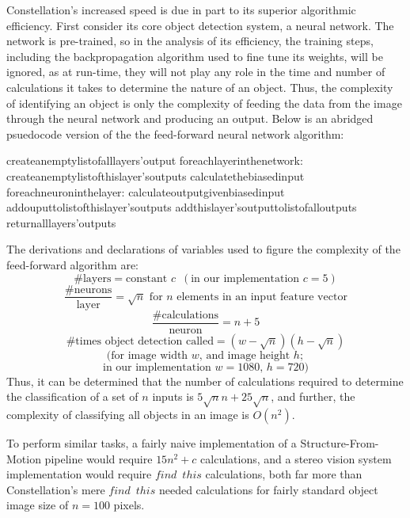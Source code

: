 Constellation's increased speed is due in part to its superior algorithmic efficiency. First consider its core object detection system, a neural network. The network is pre-trained, so in the analysis of its efficiency, the training steps, including the backpropagation algorithm used to fine tune its weights, will be ignored, as at run-time, they will not play any role in the time and number of calculations it takes to determine the nature of an object. Thus, the complexity of identifying an object is only the complexity of feeding the data from the image through the neural network and producing an output. Below is an abridged psuedocode version of the the feed-forward neural network algorithm:
\begin{program}
create\enspace an\enspace empty\enspace list\enspace of\enspace all\enspace layers'\enspace output
for\enspace each\enspace layer\enspace in\enspace the\enspace network:
\enspace\enspace	create\enspace an\enspace empty\enspace list\enspace of\enspace this\enspace layer's\enspace outputs
\enspace\enspace	calculate\enspace the\enspace biased\enspace input
\enspace\enspace	for\enspace each\enspace neuron\enspace in\enspace the\enspace layer:
\enspace\enspace\enspace\enspace		calculate\enspace output\enspace given\enspace biased\enspace input
\enspace\enspace\enspace\enspace		add\enspace ouput\enspace to\enspace list\enspace of\enspace this\enspace layer's\enspace outputs
\enspace\enspace	add\enspace this\enspace layer's\enspace output\enspace to\enspace list\enspace of\enspace all\enspace outputs
return\enspace all\enspace layers'\enspace outputs
\end{program}
The derivations and declarations of variables used to figure the complexity of the feed-forward algorithm are:
$$\text{\# layers}=\text{constant }c \enspace (\text{in our implementation }c=5)$$
$$\frac{\text{\# neurons}}{\text{layer}}=\sqrt{n}\text{ for $n$ elements in an input feature vector}$$
$$\frac{\text{\# calculations}}{\text{neuron}}=n+5$$
$$\text{\# times object detection called}=(w-\sqrt{n})(h-\sqrt{n})$$
$$\text{(for image width }w\text{, and image height }h;$$
$$\text{in our implementation }w=1080\text{, }h=720)$$
Thus, it can be determined that the number of calculations required to determine the classification of a set of $n$ inputs is $5\sqrt{n}n+25\sqrt{n}$, and further, the complexity of classifying all objects in an image is $O(n^2)$. 

To perform similar tasks, a fairly naive implementation of a Structure-From-Motion pipeline would require $15n^2+c$ calculations, and a stereo vision system implementation would require $find\enspace this$ calculations, both far more than Constellation's mere $find\enspace this$ needed calculations for fairly standard object image size of $n=100$ pixels.